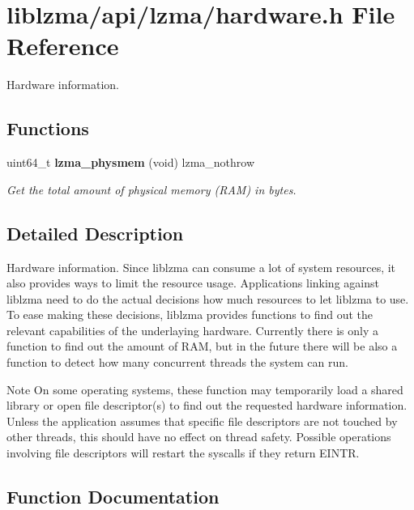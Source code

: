 \section{liblzma/api/lzma/hardware.h File Reference}
\label{liblzma_2api_2lzma_2hardware_8h}


Hardware information.  


\subsection*{Functions}
\begin{DoxyCompactItemize}
\item 
uint64\-\_\-t {\bf lzma\-\_\-physmem} (void) lzma\-\_\-nothrow
\begin{DoxyCompactList}\small\item\em Get the total amount of physical memory (R\-A\-M) in bytes. \end{DoxyCompactList}\end{DoxyCompactItemize}


\subsection{Detailed Description}
Hardware information. Since liblzma can consume a lot of system resources, it also provides ways to limit the resource usage. Applications linking against liblzma need to do the actual decisions how much resources to let liblzma to use. To ease making these decisions, liblzma provides functions to find out the relevant capabilities of the underlaying hardware. Currently there is only a function to find out the amount of R\-A\-M, but in the future there will be also a function to detect how many concurrent threads the system can run.

\begin{DoxyNote}{Note}
On some operating systems, these function may temporarily load a shared library or open file descriptor(s) to find out the requested hardware information. Unless the application assumes that specific file descriptors are not touched by other threads, this should have no effect on thread safety. Possible operations involving file descriptors will restart the syscalls if they return E\-I\-N\-T\-R. 
\end{DoxyNote}


\subsection{Function Documentation}
